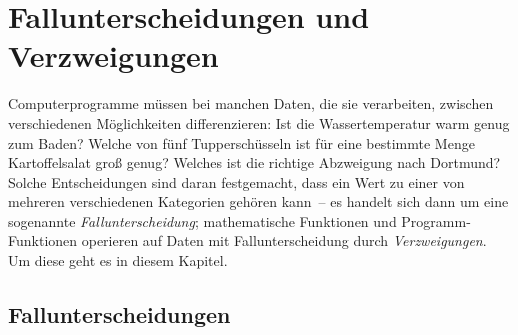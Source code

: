 
\chapter{Fallunterscheidungen und Verzweigungen}
\label{cha:conditionals}

Computerprogramme müssen bei manchen Daten, die sie
verarbeiten, zwischen verschiedenen Möglichkeiten differenzieren: Ist
die Wassertemperatur warm genug zum Baden?  Welche von fünf
Tupperschüsseln ist für eine bestimmte Menge Kartoffelsalat groß
genug?  Welches ist die richtige Abzweigung nach Dortmund?  Solche
Entscheidungen sind daran festgemacht, dass ein Wert zu einer von mehreren
verschiedenen 
Kategorien gehören kann~-- es handelt sich dann um eine sogenannte
\textit{Fallunterscheidung}; 
mathematische Funktionen und Programm-Funktionen operieren auf Daten mit
Fallunterscheidung durch \textit{Verzweigungen}.
Um diese geht es in diesem Kapitel.

\section{Fallunterscheidungen}
\label{sec:fallunterscheidungen}

